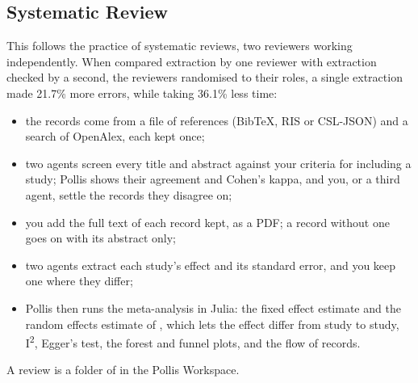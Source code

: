 \subsection{Systematic Review}
This follows the practice of systematic reviews, two reviewers working independently. When
 compared extraction by one reviewer with extraction
checked by a second, the reviewers randomised to their roles, a single extraction made 21.7\% more errors, while
taking 36.1\% less time:
\begin{itemize}
  \item the records come from a file of references (BibTeX, RIS or CSL-JSON) and a search of OpenAlex, each kept once;
  \item two agents screen every title and abstract against your criteria for including a study; Pollis shows their
    agreement and Cohen's kappa, and you, or a third agent, settle the records they disagree on;
  \item you add the full text of each record kept, as a PDF; a record without one goes on with its abstract only;
  \item two agents extract each study's effect and its standard error, and you keep one where they differ;
  \item Pollis then runs the meta-analysis in Julia: the fixed effect estimate and the random effects estimate of
    , which lets the effect differ from study to study, I\textsuperscript{2},
    Egger's test, the forest and funnel plots, and the flow of records.
\end{itemize}
A review is a folder of  in the Pollis Workspace.

